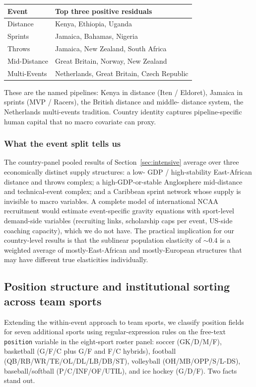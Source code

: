 \documentclass[11pt]{article}
\begin{document}
\begin{center}
\small
\begin{tabular}{lp{}}
\toprule
Event       & Top three positive residuals \\
\midrule
Distance    & Kenya, Ethiopia, Uganda \\
Sprints     & Jamaica, Bahamas, Nigeria \\
Throws      & Jamaica, New Zealand, South Africa \\
Mid-Distance& Great Britain, Norway, New Zealand \\
Multi-Events& Netherlands, Great Britain, Czech Republic \\
\bottomrule
\end{tabular}
\end{center}

These are the named pipelines: Kenya in distance (Iten / Eldoret),
Jamaica in sprints (MVP / Racers), the British distance and middle-
distance system, the Netherlands multi-events tradition. Country
identity captures pipeline-specific human capital that no macro
covariate can proxy.

\subsubsection*{What the event split tells us}

The country-panel pooled results of Section~\ref{sec:intensive}
average over three economically distinct supply structures: a low-
GDP / high-stability East-African distance and throws complex; a
high-GDP-or-stable Anglosphere mid-distance and technical-event
complex; and a Caribbean sprint network whose supply is invisible to
macro variables. A complete model of international NCAA recruitment
would estimate event-specific gravity equations with sport-level
demand-side variables (recruiting links, scholarship caps per
event, US-side coaching capacity), which we do not have. The
practical implication for our country-level results is that the
sublinear population elasticity of $\sim 0.4$ is a weighted average
of mostly-East-African and mostly-European structures that may have
different true elasticities individually.

\subsection{Position structure and institutional sorting across team sports}
\label{sec:position}

Extending the within-event approach to team sports, we classify
position fields for seven additional sports using regular-expression
rules on the free-text \texttt{position} variable in the eight-sport
roster panel: soccer (GK/D/M/F), basketball (G/F/C plus G/F and F/C
hybrids), football (QB/RB/WR/TE/OL/DL/LB/DB/ST), volleyball
(OH/MB/OPP/S/L-DS), baseball/softball (P/C/INF/OF/UTIL), and ice
hockey (G/D/F).  Two facts stand out.
\end{document}
